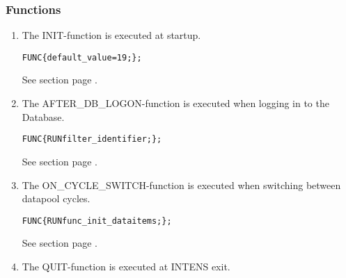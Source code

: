 \subsubsection{Functions}
\begin{enumerate}
\item The INIT-function is executed at startup.
\label{releasenotesfuncinit}

\begin{boxedminipage}[t]{\linewidth}
\begin{alltt}
  FUNC \INIT \{ default_value = 19; \};
\end{alltt}
\end{boxedminipage}

See section  page \pageref{sec:funcidentifiers}. \\

\item The AFTER\_DB\_LOGON-function is executed when logging in to the Database.

\begin{boxedminipage}[t]{\linewidth}
\begin{alltt}
  FUNC \AFTERDBLOGON \{ RUN filter_identifier; \};
\end{alltt}
\end{boxedminipage}

See section  page \pageref{sec:funcidentifiers}. \\

\item The ON\_CYCLE\_SWITCH-function is executed when switching between datapool cycles.

\begin{boxedminipage}[t]{\linewidth}
\begin{alltt}
  FUNC \ONCYCLESWITCH \{ RUN func_init_dataitems; \};
\end{alltt}
\end{boxedminipage}

See section  page \pageref{sec:funcidentifiers}. \\

\item The QUIT-function is executed at INTENS exit.


\end{enumerate}
